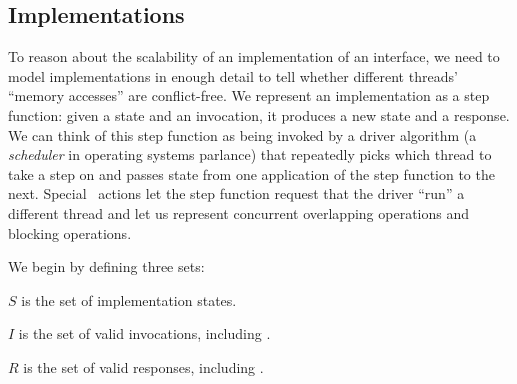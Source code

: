

\subsection{Implementations}
\label{sec:rule:implementations}

To reason about the scalability of an implementation of an interface,
we need to model
implementations in enough detail to tell
whether different threads' ``memory accesses'' are conflict-free.
%
We represent an implementation as a step
function: given a state and an invocation, it produces a new state and a
response.
%
We can think of this step function as being invoked by a driver
algorithm (a \emph{scheduler} in operating systems parlance) that
repeatedly picks which thread to take a step on and passes state from
one application of the step
function to the next.
%
Special \CONTINUE\ actions let the step function request that the
driver ``run'' a different thread and let us represent
concurrent overlapping operations and blocking operations.

We begin by defining three sets:

\begin{CompactItemize}
\item $S$ is the set of implementation states.
\item $I$ is the set of valid invocations, including \CONTINUE.
\item $R$ is the set of valid responses, including \CONTINUE.
\end{CompactItemize}

